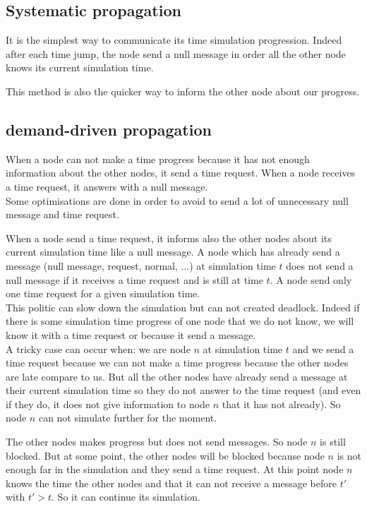 \subsection{Systematic propagation}
It is the simplest way to communicate its time simulation progression.
Indeed after each time jump, the node send a null message in order all the other
node knows its current simulation time.

This method is also the quicker way to inform the other node about our progress.

\subsection{demand-driven propagation}
When a node can not make a time progress because it has not enough information
about the other nodes, it send a time request. When
a node receives a time request, it answers with a null message.\\

Some optimisations are done in order to avoid to send a lot of unnecessary 
null message and time request.

When a node send a time request, it informs also the other nodes about its
current simulation time like a null message.
A node which has already send a message (null message, request, normal, ...) 
at simulation time $t$ does not send a null message if it receives a time 
request and is still at time $t$.
A node send only one time request for a given simulation time.\\

This politic can slow down the simulation but can not created deadlock.
Indeed if there is some simulation time progress of one node that we do not know,
we will know it with a time request or because it send a message.\\

A tricky case can occur when: we are node $n$ at simulation time $t$ and
we send a time request because we can not make a time progress because the other
nodes are late compare to us. But all the other nodes have already send a message
at their current simulation time so they do not answer to the time request
(and even if they do, it does not give information to node $n$ that it has not already).
So node $n$ can not simulate further for the moment.

The other nodes makes progress but does not send messages. So node $n$ is still blocked.
But at some point, the other nodes will be blocked because node $n$ is not enough far in
the simulation and they send a time request. At this point node $n$ knows the time the
other nodes and that it can not receive a message before $t'$ with $t'>t$. So it can 
continue its simulation.
